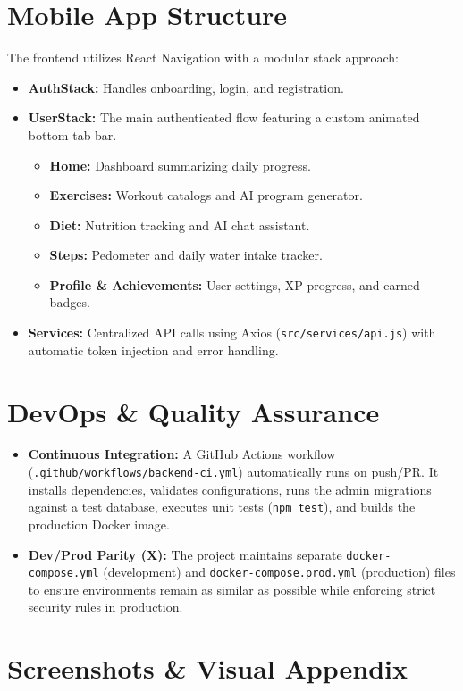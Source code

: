 \documentclass[12pt,a4paper]{article}
\begin{document}
\section{Mobile App Structure}
The frontend utilizes React Navigation with a modular stack approach:
\begin{itemize}
    \item \textbf{AuthStack:} Handles onboarding, login, and registration.
    \item \textbf{UserStack:} The main authenticated flow featuring a custom animated bottom tab bar.
    \begin{itemize}
        \item \textbf{Home:} Dashboard summarizing daily progress.
        \item \textbf{Exercises:} Workout catalogs and AI program generator.
        \item \textbf{Diet:} Nutrition tracking and AI chat assistant.
        \item \textbf{Steps:} Pedometer and daily water intake tracker.
        \item \textbf{Profile \& Achievements:} User settings, XP progress, and earned badges.
    \end{itemize}
    \item \textbf{Services:} Centralized API calls using Axios (\texttt{src/services/api.js}) with automatic token injection and error handling.
\end{itemize}

\section{DevOps \& Quality Assurance}
\begin{itemize}
    \item \textbf{Continuous Integration:} A GitHub Actions workflow (\texttt{.github/workflows/backend-ci.yml}) automatically runs on push/PR. It installs dependencies, validates configurations, runs the admin migrations against a test database, executes unit tests (\texttt{npm test}), and builds the production Docker image.
    \item \textbf{Dev/Prod Parity (X):} The project maintains separate \texttt{docker-compose.yml} (development) and \texttt{docker-compose.prod.yml} (production) files to ensure environments remain as similar as possible while enforcing strict security rules in production.
\end{itemize}

\section{Screenshots \& Visual Appendix}
\end{document}
